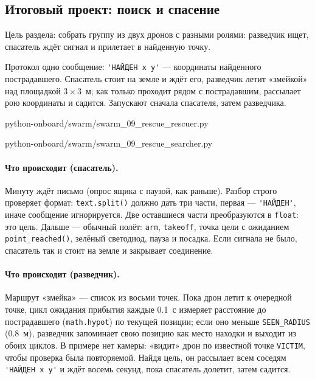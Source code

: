 \subsection{Итоговый проект: поиск и спасение}
\label{sec:swarm-project}

Цель раздела: собрать группу из двух дронов с разными ролями: разведчик ищет, спасатель ждёт сигнал и прилетает в найденную точку.

Протокол одно сообщение: \verb|'НАЙДЕН x y'| --- координаты найденного пострадавшего. Спасатель стоит на земле и ждёт его, разведчик летит «змейкой» над площадкой $3\times 3$~м; как только проходит рядом с пострадавшим, рассылает рою координаты и садится. Запускают сначала спасателя, затем разведчика.

\begin{codefile}[python]{python-onboard/swarm/swarm_09_rescue_rescuer.py}
\end{codefile}

\begin{codefile}[python]{python-onboard/swarm/swarm_09_rescue_searcher.py}
\end{codefile}

\paragraph{Что происходит (спасатель).} Минуту ждёт письмо (опрос ящика с паузой, как раньше). Разбор строго проверяет формат: \verb|text.split()| должно дать три части, первая --- \verb|'НАЙДЕН'|, иначе сообщение игнорируется. Две оставшиеся части преобразуются в \verb|float|: это цель. Дальше --- обычный полёт: \verb|arm|, \verb|takeoff|, точка цели с ожиданием \verb|point_reached()|, зелёный светодиод, пауза и посадка. Если сигнала не было, спасатель так и стоит на земле и закрывает соединение.

\paragraph{Что происходит (разведчик).} Маршрут «змейка» --- список из восьми точек. Пока дрон летит к очередной точке, цикл ожидания прибытия каждые 0.1~с измеряет расстояние до пострадавшего (\verb|math.hypot|) по текущей позиции; если оно меньше \verb|SEEN_RADIUS| (0.8~м), разведчик запоминает свою позицию как место находки и выходит из обоих циклов. В примере нет камеры: «видит» дрон по известной точке \verb|VICTIM|, чтобы проверка была повторяемой. Найдя цель, он рассылает всем соседям \verb|'НАЙДЕН x y'| и ждёт восемь секунд, пока спасатель долетит, затем садится.

